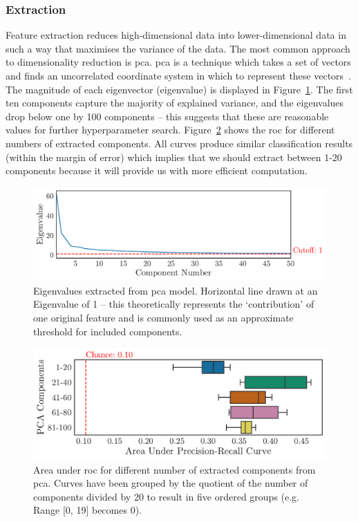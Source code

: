 \documentclass[../thesis/thesis.tex]{subfiles}
\begin{document}
\subsubsection{Extraction}

Feature extraction reduces high-dimensional data into lower-dimensional data in such a way that maximises the variance of the data. The most common approach to dimensionality reduction is \gls{pca}. \Gls{pca} is a technique which takes a set of vectors and finds an uncorrelated coordinate system in which to represent these vectors~\cite{friedman2001}. The magnitude of each eigenvector (eigenvalue) is displayed in Figure~\ref{fig:design:scree_plot}. The first ten components capture the majority of explained variance, and the eigenvalues drop below one by 100 components -- this suggests that these are reasonable values for further hyperparameter search. Figure~\ref{fig:design:extractor} shows the \gls{roc} for different numbers of extracted components. All curves produce similar classification results (within the margin of error) which implies that we should extract between 1-20 components because it will provide us with more efficient computation.

\begin{figure}[!htb]
    \centering
    \includegraphics[width=\textwidth]{../figures/design/distribution_eigenvalues}
    \caption[Distribution of eigenvalues -- \gls{pca}]{Eigenvalues extracted from \gls{pca} model. Horizontal line drawn at an Eigenvalue of 1 -- this theoretically represents the `contribution' of one original feature and is commonly used as an approximate threshold for included components.}
    \label{fig:design:scree_plot}
\end{figure}

\begin{figure}[!htb]
    \centering
    \includegraphics[width=\textwidth]{../figures/design/auc_extractor}
    \caption[Area under \gls{pr} Curves by \gls{pca} techniques]{Area under \gls{roc} for different number of extracted components from \gls{pca}. Curves have been grouped by the quotient of the number of components divided by 20 to result in five ordered groups (e.g. Range [0, 19] becomes 0).}
    \label{fig:design:extractor}
\end{figure}
\end{document}
